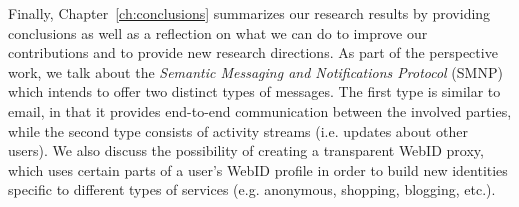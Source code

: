 Finally, Chapter~\ref{ch:conclusions} summarizes our research results by providing conclusions as well as a reflection on what we can do to improve our contributions and to provide new research directions. As part of the perspective work, we talk about the \textit{Semantic Messaging and Notifications Protocol} (SMNP) which intends to offer two distinct types of messages. The first type is similar to email, in that it provides end-to-end communication between the involved parties, while the second type consists of activity streams (i.e. updates about other users). We also discuss the possibility of creating a transparent WebID proxy, which uses certain parts of a user's WebID profile in order to build new identities specific to different types of services (e.g. anonymous, shopping, blogging, etc.).